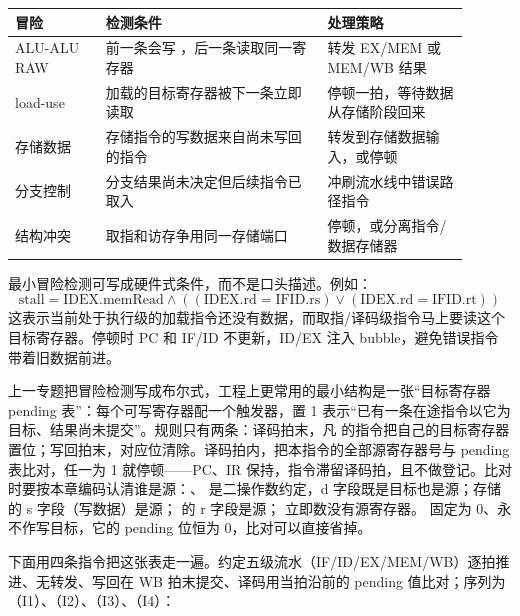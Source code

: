 \begin{longtable}{L{0.18\linewidth}L{0.44\linewidth}L{0.28\linewidth}}
\toprule
冒险 & 检测条件 & 处理策略 \\
\midrule
ALU-ALU RAW & 前一条会写 ，后一条读取同一寄存器 & 转发 EX/MEM 或 MEM/WB 结果 \\
load-use & 加载的目标寄存器被下一条立即读取 & 停顿一拍，等待数据从存储阶段回来 \\
存储数据 & 存储指令的写数据来自尚未写回的指令 & 转发到存储数据输入，或停顿 \\
分支控制 & 分支结果尚未决定但后续指令已取入 & 冲刷流水线中错误路径指令 \\
结构冲突 & 取指和访存争用同一存储端口 & 停顿，或分离指令/数据存储器 \\
\bottomrule
\end{longtable}

最小冒险检测可写成硬件式条件，而不是口头描述。例如：
\[
\text{stall} = \text{IDEX.memRead}\land((\text{IDEX.rd}=\text{IFID.rs})\lor(\text{IDEX.rd}=\text{IFID.rt}))
\]
这表示当前处于执行级的加载指令还没有数据，而取指/译码级指令马上要读这个目标寄存器。停顿时 PC 和 IF/ID 不更新，ID/EX 注入 bubble，避免错误指令带着旧数据前进。

上一专题把冒险检测写成布尔式，工程上更常用的最小结构是一张“目标寄存器 pending 表”：每个可写寄存器配一个触发器，置 1 表示“已有一条在途指令以它为目标、结果尚未提交”。规则只有两条：译码拍末，凡  的指令把自己的目标寄存器置位；写回拍末，对应位清除。译码拍内，把本指令的全部源寄存器号与 pending 表比对，任一为 1 就停顿——PC、IR 保持，指令滞留译码拍，且不做登记。比对时要按本章编码认清谁是源：、 是二操作数约定，d 字段既是目标也是源；存储  的 s 字段（写数据）是源； 的 r 字段是源； 立即数没有源寄存器。 固定为 0、永不作写目标，它的 pending 位恒为 0，比对可以直接省掉。

下面用四条指令把这张表走一遍。约定五级流水（IF/ID/EX/MEM/WB）逐拍推进、无转发、写回在 WB 拍末提交、译码用当拍沿前的 pending 值比对；序列为 （I1）、（I2）、（I3）、（I4）：

